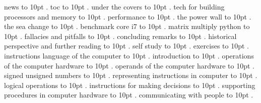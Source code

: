 
\pdfpagewidth=148mm
\pdfpageheight=210mm
\hsize=128mm
\vsize=190mm

\pdfhorigin=0pt
\pdfvorigin=0pt
\hoffset=10mm
\voffset=10mm
\noindent news \leaders\hbox to 10pt {\hss.\hss}  \hfill {}
\smallskip
\noindent toc \leaders\hbox to 10pt {\hss.\hss}  \hfill {}
\smallskip
{} under the covers \leaders\hbox to 10pt {\hss.\hss}  \hfill {}
\smallskip
{} tech for building processors and memory \leaders\hbox to 10pt {\hss.\hss}  \hfill {}
\smallskip
{} performance \leaders\hbox to 10pt {\hss.\hss}  \hfill {}
\smallskip
{} the power wall \leaders\hbox to 10pt {\hss.\hss}  \hfill {}
\smallskip
{} the sea change \leaders\hbox to 10pt {\hss.\hss}  \hfill {}
\smallskip
{} benchmark core i7 \leaders\hbox to 10pt {\hss.\hss}  \hfill {}
\smallskip
{} matrix multiply python \leaders\hbox to 10pt {\hss.\hss}  \hfill {}
\smallskip
{} fallacies and pitfalls \leaders\hbox to 10pt {\hss.\hss}  \hfill {}
\smallskip
{} concluding remarks \leaders\hbox to 10pt {\hss.\hss}  \hfill {}
\smallskip
{} historical perspective and further reading \leaders\hbox to 10pt {\hss.\hss}  \hfill {}
\smallskip
{} self study \leaders\hbox to 10pt {\hss.\hss}  \hfill {}
\smallskip
{} exercises \leaders\hbox to 10pt {\hss.\hss}  \hfill {}
\smallskip
{} instructions language of the computer \leaders\hbox to 10pt {\hss.\hss}  \hfill {}
\smallskip
{} introduction \leaders\hbox to 10pt {\hss.\hss}  \hfill {}
\smallskip
{} operations of the computer hardware \leaders\hbox to 10pt {\hss.\hss}  \hfill {}
\smallskip
{} operands of the computer hardware \leaders\hbox to 10pt {\hss.\hss}  \hfill {}
\smallskip
{} signed unsigned numbers \leaders\hbox to 10pt {\hss.\hss}  \hfill {}
\smallskip
{} representing instructions in computer \leaders\hbox to 10pt {\hss.\hss}  \hfill {}
\smallskip
{} logical operations \leaders\hbox to 10pt {\hss.\hss}  \hfill {}
\smallskip
{} instructions for making decisions \leaders\hbox to 10pt {\hss.\hss}  \hfill {}
\smallskip
{} supporting procedures in computer hardware \leaders\hbox to 10pt {\hss.\hss}  \hfill {}
\smallskip
{} communicating with people \leaders\hbox to 10pt {\hss.\hss}  \hfill {}
